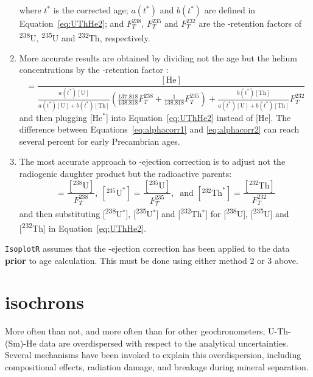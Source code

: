 \begin{refsection}
\begin{enumerate}
  \noindent where $t^*$ is the corrected age; $a(t^*)$ and $b(t^*)$ are
  defined in Equation~\ref{eq:UThHe2}; and $F_T^{238}$, $F_T^{235}$
  and $F_T^{232}$ are the \textalpha-retention factors of
  \textsuperscript{238}U, \textsuperscript{235}U and
  \textsuperscript{232}Th, respectively.
\item More accurate results are obtained by dividing not the age but
  the helium concentrations by the \textalpha-retention factor
  \citep{min2003, vermeesch2008a}:
  \begin{equation}
    [\mbox{He}^*] = \frac{[\mbox{He}]}{
      \frac{a(t^*)[\mbox{U}]}{a(t^*)[\mbox{U}]+b(t^*)[\mbox{Th}]}
      \left(
      \frac{137.818}{138.818} F_T^{238} +
      \frac{1}{138.818} F_T^{235}
      \right) + 
      \frac{b(t^*)[\mbox{Th}]}{a(t^*)[\mbox{U}]+b(t^*)[\mbox{Th}]} F_T^{232}
    }
    \label{eq:alphacorr2}
  \end{equation}
  \noindent and then plugging [He$^*$] into Equation~\ref{eq:UThHe2}
  instead of [He]. The difference between
  Equations~\ref{eq:alphacorr1} and \ref{eq:alphacorr2} can reach
  several percent for early Precambrian ages.
\item The most accurate approach to \textalpha-ejection correction is to
  adjust not the radiogenic daughter product but the radioactive
  parents:
  \begin{equation}
      [{}^{238}\mbox{U}^*] = \frac{[{}^{238}\mbox{U}]}{F_T^{238}},~
      [{}^{235}\mbox{U}^*] = \frac{[{}^{235}\mbox{U}]}{F_T^{235}},~
      \mbox{~and~} [{}^{232}\mbox{Th}^*] =
      \frac{[{}^{232}\mbox{Th}]}{F_T^{232}}
    \label{eq:alphacorr3}
  \end{equation}
  \noindent and then substituting [\textsuperscript{238}U$^*$],
            [\textsuperscript{235}U$^*$] and [\textsuperscript{232}Th$^*$]
            for [\textsuperscript{238}U], [\textsuperscript{235}U] and
            [\textsuperscript{232}Th] in Equation~\ref{eq:UThHe2}.
\end{enumerate}

\texttt{IsoplotR} assumes that the \textalpha-ejection correction has
been applied to the data \textbf{prior} to age calculation. This must
be done using either method 2 or 3 above.

\section{isochrons}

More often than not, and more often than for other geochronometers,
U-Th-(Sm)-He data are overdispersed with respect to the analytical
uncertainties. Several mechanisms have been invoked to explain this
overdispersion, including compositional effects, radiation damage, and
breakage during mineral separation.\\


\end{refsection}

